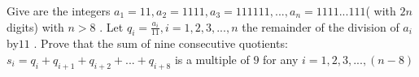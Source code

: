 Give are the integers $a_{1}=11 ,  a_{2}=1111, a_{3}=111111, ... , a_{n}= 1111...111$( with $2n$ digits) with $n > 8$ .
Let $q_{i}= \frac{a_{i}}{11} , i= 1,2,3, ... , n$ the remainder of the division of $a_{i}$ by$ 11$ .
Prove that the sum of nine consecutive  quotients:  $s_{i}=q_{i}+q_{i+1}+q_{i+2}+ ... +q_{i+8}$  is a multiple of $9$ for any $i= 1,2,3, ... , (n-8)$